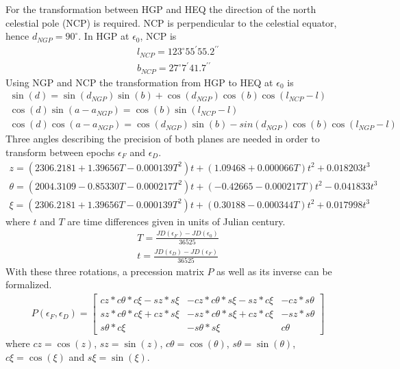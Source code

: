 \documentclass[letterpaper,10pt,english]{sphinxmanual}
\begin{document}
\sphinxAtStartPar
For the transformation between HGP and HEQ the direction of the north celestial pole (NCP) is required.
NCP is perpendicular to the celestial equator, hence \(d_{NGP} = 90^{\circ}\).
In HGP at \(\epsilon_0\), NCP is
\begin{equation*}
\begin{split}l_{NCP} = 123^{\circ}55^\prime55.2^{\prime\prime}\\
b_{NCP} = 27^{\circ}7^\prime41.7^{\prime\prime}\end{split}
\end{equation*}
\sphinxAtStartPar
Using NGP and NCP the transformation from HGP to HEQ at \(\epsilon_0\) is
\begin{equation*}
\begin{split}\sin(d) = \sin(d_{NGP})\sin(b) + \cos(d_{NGP})\cos(b)\cos(l_{NCP}-l) \\
\cos(d)\sin(a-a_{NGP}) = \cos(b)\sin(l_{NCP}-l) \\
\cos(d)\cos(a-a_{NGP}) = \cos(d_{NGP})\sin(b)-sin(d_{NGP})\cos(b)\cos(l_{NGP}-l)\end{split}
\end{equation*}
\sphinxAtStartPar
Three angles describing the precision of both planes are needed in order to transform between epochs \(\epsilon_F\) and \(\epsilon_D\).
\begin{equation*}
\begin{split}z = (2306.2181+1.39656T - 0.000139T^2 )t + (1.09468 + 0.000066T)t^2 + 0.018203t^3 \\
\theta =(2004.3109 - 0.85330T-0.000217T^2)t + (-0.42665-0.000217T)t^2 - 0.041833t^3 \\
\xi = (2306.2181+1.39656T-0.000139T^2)t+(0.30188-0.000344T)t^2+0.017998t^3\end{split}
\end{equation*}
\sphinxAtStartPar
where \(t\) and \(T\) are time differences given in units of Julian century.
\begin{equation*}
\begin{split}T = \frac{JD(\epsilon_F)-JD(\epsilon_0)}{36525} \\
t = \frac{JD(\epsilon_D)-JD(\epsilon_F)}{36525}\end{split}
\end{equation*}
\sphinxAtStartPar
With these three rotations, a precession matrix \(P\) as well as its inverse can be formalized.
\begin{equation*}
\begin{split}P(\epsilon_F,\epsilon_D) = \begin{bmatrix}
cz*c\theta*c\xi-sz*s\xi & -cz*c\theta*s\xi-sz*c\xi & -cz*s\theta\\
sz*c\theta*c\xi+cz*s\xi & -sz*c\theta*s\xi+cz*c\xi & -sz*s\theta\\
s\theta*c\xi & -s\theta*s\xi & c\theta
\end{bmatrix}\end{split}
\end{equation*}
\sphinxAtStartPar
where \(cz = \cos(z)\), \(sz = \sin(z)\), \(c\theta = \cos(\theta)\), \(s\theta = \sin(\theta)\),
\(c\xi = \cos(\xi)\) and \(s\xi = \sin(\xi)\).
\end{document}
